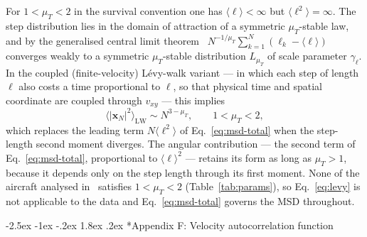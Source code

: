 \documentclass[11pt,a4paper]{article}
\makeatletter
\renewcommand\section{\@startsection{section}{1}{\z@}%
  {-2.5ex \@plus -1ex \@minus -.2ex}%
  {1.8ex \@plus.2ex}%
  {\normalfont\normalsize\bfseries\centering}}
\makeatother
\begin{document}
For $1 < \mu_T < 2$ in the survival convention one has
$\langle\ell\rangle < \infty$ but $\langle\ell^2\rangle = \infty$.
The step distribution lies in the domain of attraction of a
symmetric $\mu_T$-stable law, and by the generalised central limit
theorem~\cite{zaburdaev2015}
$N^{-1/\mu_T}\sum_{k=1}^{N}(\ell_k-\langle\ell\rangle)$ converges
weakly to a symmetric $\mu_T$-stable distribution $L_{\mu_T}$ of
scale parameter $\gamma_\ell$. In the coupled (finite-velocity)
Lévy-walk variant --- in which each step of length $\ell$ also costs
a time proportional to $\ell$, so that physical time and spatial
coordinate are coupled through $v_{xy}$ --- this implies
\begin{equation}
\langle|\mathbf{x}_N|^2\rangle_{\mathrm{LW}}
 \sim N^{3-\mu_T},\qquad 1 < \mu_T < 2,
\label{eq:levy}
\end{equation}
which replaces the leading term $N\langle\ell^2\rangle$ of
Eq.~\eqref{eq:msd-total} when the step-length second moment
diverges. The angular contribution --- the second term of
Eq.~\eqref{eq:msd-total}, proportional to $\langle\ell\rangle^2$
--- retains its form as long as $\mu_T > 1$, because it depends
only on the step length through its first moment. None of the
aircraft analysed in~\cite{vilpellet2026} satisfies
$1 < \mu_T < 2$ (Table~\ref{tab:params}), so Eq.~\eqref{eq:levy} is
not applicable to the data and Eq.~\eqref{eq:msd-total} governs
the MSD throughout.

\section*{Appendix F: Velocity autocorrelation function}
\label{app:autocorr}
\end{document}
